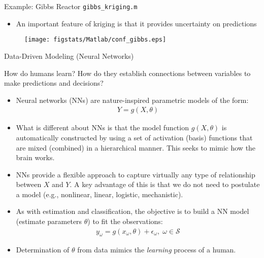 \documentclass[9pt]{beamer}
\begin{document}
%
\begin{frame}{Example: Gibbs Reactor \footnotesize{\texttt{gibbs\_kriging.m}}}

\begin{itemize}
\item An important feature of kriging is that it provides uncertainty on predictions
\end{itemize}

\begin{figure}[!htb]
    \centering
	\texttt{[image: figstats/Matlab/conf\_gibbs.eps]}
\end{figure}


\end{frame}

\begin{frame}{Data-Driven Modeling (Neural Networks)}

\begin{block}{}
How do humans learn? How do they establish connections between variables to make predictions and decisions? 
\end{block}

\begin{itemize}
   \setlength{\itemsep}{10pt}
\item Neural networks (NNs) are nature-inspired parametric models of the form:
\begin{align*}
Y=g(X,\theta)
\end{align*}
\item What is different about NNs is that the model function $g(X,\theta)$ is automatically constructed by using a set of activation (basis) functions that are mixed (combined) in a hierarchical manner.  This seeks to mimic how the brain works. 

\item NNs provide a flexible approach to capture virtually any type of relationship between $X$ and $Y$. A key advantage of this is that we do not need to postulate a model (e.g., nonlinear, linear, logistic, mechanistic).  

\item As with estimation and classification, the objective is to build a NN model (estimate parameters $\theta$) to fit the  observations:
\begin{align*}
y_\omega=g(x_\omega,\theta)+\epsilon_\omega,\; \omega \in \mathcal{S}
\end{align*}
\item Determination of $\theta$ from data mimics the {\em learning} process of a human. 

\end{itemize}

\end{frame}
\end{document}

